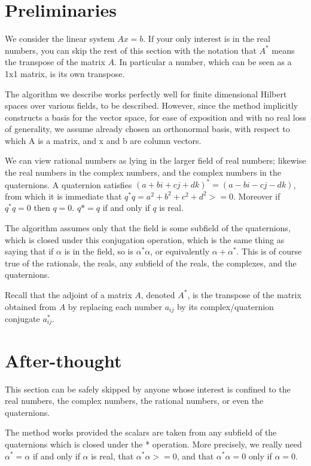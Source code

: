 \documentclass{article}
\begin{document}
\section{Preliminaries}

We consider the linear system $Ax=b$. If your only interest is in the real numbers,
you can skip the rest of this section with the notation that $A^*$ means the transpose of the matrix $A$. In particular a number, which can be seen as a 1x1 matrix, is its own transpose.

The algorithm we describe works perfectly well for finite dimensional Hilbert spaces over various fields, to be described. However, since the method implicitly constructs a basis for the vector space, for ease of exposition and with no real loss of generality, we assume already chosen an orthonormal basis, with respect to which A is a matrix, and x and b are column vectors.

We can view rational numbers as lying in the larger field of real numbers; likewise the real numbers in the complex numbers, and the complex numbers in the quaternions. A quaternion satisfies $(a + bi +cj + dk)^* = (a -bi -cj -dk)$, from which it is immediate that $q^*q = a^2 + b^2 + c^2 + d^2 >= 0$. Moreover if $q^*q =0$ then $q =0$.
$q* = q$ if and only if $q$ is real.

The algorithm assumes only that the field is some subfield of the quaternions, which is closed under this conjugation operation, which is the same thing as saying that if $\alpha$ is in the field, so is $\alpha^*\alpha$, or equivalently $\alpha + \alpha^*$. This is of course true of the rationals, the reals, any subfield of the reals, the complexes, and the quaternions.

Recall that the adjoint of a matrix $A$, denoted $A^*$, is the transpose of the matrix obtained from $A$ by replacing each number $a_{ij}$ by its complex/quaternion conjugate $a_{ij}^*$.


\section{After-thought}
This section can be safely skipped by anyone whose interest is confined to
the real numbers, the complex numbers, the rational numbers, or even the quaternions.

The method works provided the scalars are taken from any subfield of the
quaternions which is closed under the * operation. More precisely, we really
need $\alpha^* = \alpha$ if and only if $\alpha$ is real, that $\alpha^*\alpha >= 0$, and that 
$\alpha^*\alpha = 0$ only if $\alpha=0$.
\end{document}
